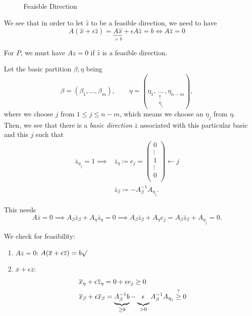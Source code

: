 \begin{figure}[H]
	\centering
	\caption{Feaisble Direction}
	\label{fig:feasible-direction}
\end{figure}

We see that in order to let \(\hat{z}\) to be a feasible direction, we need to have
\[
	A(\hat{x} + \epsilon \hat{z}) = \underbrace{A \hat{x}}_{=b} + \epsilon A \hat{z} = b \iff A \hat{z} = 0
\]

\begin{remark}
	For \(P\), we must have \(A \hat{z} = 0\) if \(\hat{z}\) is a feasible direction.
\end{remark}

\hr
Let the basic partition \(\beta, \eta\) being
\[
	\beta = (\beta_1, \ldots , \beta_m), \qquad \eta = (\eta_1, \underset{\substack{\uparrow \\ \eta_j}}{\ldots} , \eta_{n-m}),
\]
where we choose \(j\) from \(1\leq j \leq n-m\), which means we choose an \(\eta_j\) from \(\eta\). Then, we see that there is a \emph{basic direction}
\(\overline{z}\) associated with this particular basic and this \(j\) such that
\[
	\begin{split}
		\overline{z}_{\eta_j} = 1 \implies &\overline{z}_{\eta} \coloneqq e_j = \begin{pmatrix}
			0      \\
			\vdots \\
			1      \\
			\vdots \\
			0      \\
		\end{pmatrix}\leftarrow j\\
		&\overline{z}_{\beta} \coloneqq -A^{-1}_{\beta}A_{\eta_j}.
	\end{split}
\]

\begin{note}
	This needs
	\[
		A \overline{z} = 0 \implies A_{\beta}\overline{z}_{\beta} + A_{\eta}\overline{z}_{\eta} = 0 \implies A_{\beta}\overline{z}_{\beta}+A_{\eta}e_{j} = A_{\beta}\overline{z}_{\beta}+A_{\eta_j} = 0.
	\]
\end{note}

We check for feasibility:
\begin{enumerate}
	\item \(A \overline{z} = 0\): \(A(\overline{x} + \epsilon \overline{z}) = b\surd\)
	\item \(\overline{x} + \epsilon \overline{z}\):
	      \[
		      \begin{split}
			      &\overline{x}_{\eta} + \epsilon \overline{z}_{\eta} = 0 + \epsilon e_j \geq  0\\
			      &\overline{x}_{\beta}+\epsilon \overline{x}_{\beta} = \underbrace{A^{-1}_{\beta}b}_{\geq 0} - \underbrace{\vphantom{A^{-1}_{\beta}}\epsilon}_{>0} A^{-1}_{\beta}A_{\eta_j}\overset{?}{\geq}  0
		      \end{split}
	      \]
\end{enumerate}

